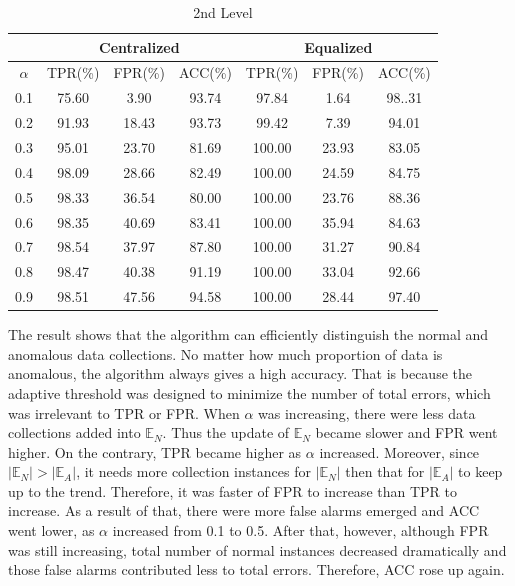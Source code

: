 \documentclass[a4paper]{IEEEtran}
\begin{document}
			\begin{table}[!ht]
				\centering
				\caption{2nd Level}
				\label{tab:syn-result-2nd}
				\begin{tabular}{|c|c|c|c|c|c|c|}
					\hline
					& \multicolumn{3}{c|}{Centralized} & \multicolumn{3}{c|}{Equalized}\\
					\hline
					$\alpha$ & TPR(\%) & FPR(\%) & ACC(\%) & TPR(\%) & FPR(\%) & ACC(\%) \\ 
					\hline
					0.1 & 75.60 & 3.90 & 93.74 & 97.84 & 1.64 & 98..31 \\ 
					\hline
					0.2 & 91.93 & 18.43 & 93.73 & 99.42 & 7.39 & 94.01 \\ 
					\hline
					0.3 & 95.01 & 23.70 & 81.69 & 100.00 & 23.93 & 83.05 \\ 
					\hline
					0.4 & 98.09 & 28.66 & 82.49 & 100.00 & 24.59 & 84.75 \\ 
					\hline
					0.5 & 98.33 & 36.54 & 80.00 & 100.00 & 23.76 & 88.36 \\ 
					\hline
					0.6 & 98.35 & 40.69 & 83.41 & 100.00 & 35.94 & 84.63 \\ 
					\hline
					0.7 & 98.54 & 37.97 & 87.80 & 100.00 & 31.27 & 90.84 \\ 
					\hline
					0.8 & 98.47 & 40.38 & 91.19 & 100.00 & 33.04 & 92.66 \\ 
					\hline
					0.9 & 98.51 & 47.56 & 94.58 & 100.00 & 28.44 & 97.40\\
					\hline
				\end{tabular} 
			\end{table}
			
			The result shows that the algorithm can efficiently distinguish the normal and anomalous data collections. No matter how much proportion of data is anomalous, the algorithm always gives a high accuracy. That is because the adaptive threshold was designed to minimize the number of total errors, which was irrelevant to TPR or FPR. When $\alpha$ was increasing, there were less data collections added into $\mathbb{E}_N$. Thus the update of $\mathbb{E}_N$ became slower and FPR went higher. On the contrary, TPR became higher as $\alpha$ increased. Moreover, since $|\mathbb{E}_N| > |\mathbb{E}_A|$, it needs more collection instances for $|\mathbb{E}_N|$ then that for $|\mathbb{E}_A|$ to keep up to the trend. Therefore, it was faster of FPR to increase than TPR to increase. As a result of that, there were more false alarms emerged and ACC went lower, as $\alpha$ increased from 0.1 to 0.5. After that, however, although FPR was still increasing, total number of normal instances decreased dramatically and those false alarms contributed less to total errors. Therefore, ACC rose up again.
			
\end{document}
